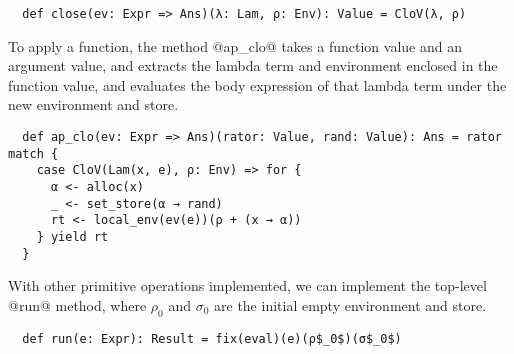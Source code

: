 \begin{lstlisting}
  def close(ev: Expr => Ans)(λ: Lam, ρ: Env): Value = CloV(λ, ρ)
\end{lstlisting}

To apply a function, the method @ap_clo@ takes a function value and an argument
value, and extracts the lambda term and environment enclosed in the function value,
and evaluates the body expression of that lambda term under the new environment and store.

\begin{lstlisting}
  def ap_clo(ev: Expr => Ans)(rator: Value, rand: Value): Ans = rator match {
    case CloV(Lam(x, e), ρ: Env) => for {
      α <- alloc(x)
      _ <- set_store(α → rand)
      rt <- local_env(ev(e))(ρ + (x → α))
    } yield rt
  }
\end{lstlisting}

With other primitive operations implemented, we can implement the top-level
@run@ method, where $\rho_0$ and $\sigma_0$ are the initial empty environment and
store.

\begin{lstlisting}
  def run(e: Expr): Result = fix(eval)(e)(ρ$_0$)(σ$_0$)
\end{lstlisting}
